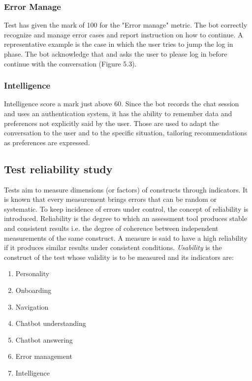 \documentclass[b5paper,10pt,twoside,cucitura]{toptesi}
\begin{document}
\subsubsection{Error Manage} Test has given the mark of 100 for the "Error manage" metric. The bot correctly recognize and manage error cases and report instruction on how to continue. A representative example is the case in which the user tries to jump the log in phase. The bot acknowledge that and asks the user to please log in before continue with the conversation (Figure 5.3).

\subsubsection{Intelligence} Intelligence score a mark just above 60. Since the bot records the chat session and uses an authentication system, it has the ability to remember data and preferences not explicitly said by the user. Those are used to adapt the conversation to the user and to the specific situation, tailoring recommendations as preferences are expressed.

\subsection{Test reliability study}

Tests aim to measure dimensions (or factors) of constructs through indicators. It is known that every measurement brings errors that can be random or systematic. To keep incidence of errors under control, the concept of reliability is introduced. Reliability is the degree to which an assessment tool produces stable and consistent results i.e. the degree of coherence between independent measurements of the same construct. A measure is said to have a high reliability if it produces similar results under consistent conditions. 
\textit{Usability} is the construct of the test whose validity is to be measured and its indicators are:
\begin{enumerate}
\item Personality
\item Onboarding
\item Navigation
\item Chatbot understanding
\item Chatbot answering
\item Error management
\item Intelligence
\end{enumerate}
\end{document}
